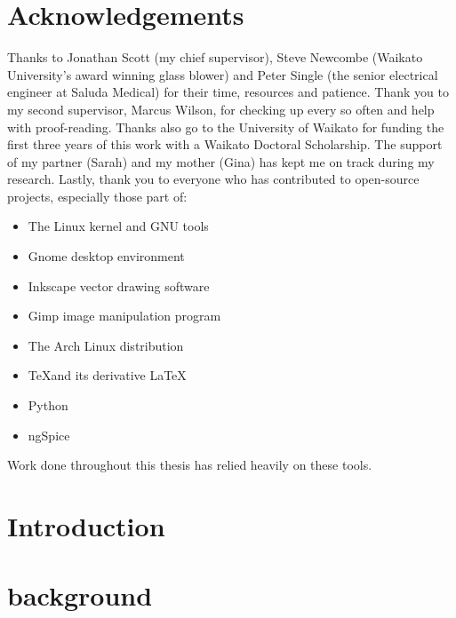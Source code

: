 \chapter*{Acknowledgements}
Thanks to Jonathan Scott (my chief supervisor), Steve Newcombe (Waikato University's award winning glass blower) and Peter Single (the senior electrical engineer at Saluda Medical) for their time, resources and patience.
Thank you to my second supervisor, Marcus Wilson, for checking up every so often and help with proof-reading.
Thanks also go to the University of Waikato for funding the first three years of this work with a Waikato Doctoral Scholarship.
The support of my partner (Sarah) and my mother (Gina) has kept me on track during my research.
Lastly, thank you to everyone who has contributed to open-source projects, especially those part of:
\begin{itemize}
\item The Linux kernel and GNU tools
\item Gnome desktop environment
\item Inkscape vector drawing software
\item Gimp image manipulation program
\item The Arch Linux distribution
\item \TeX \space and its derivative \LaTeX
\item Python
\item ngSpice
\end{itemize}
Work done throughout this thesis has relied heavily on these tools.

\tableofcontents{}
\listoffigures
\listoftables
\doublespacing



 \chapter{Introduction}
   \label{chap:introduction_main}
   


 \chapter{background}
   \label{chap:background}
   

